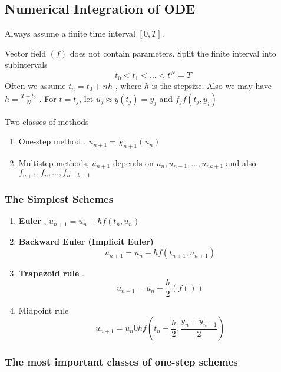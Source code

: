 \documentclass{article}
\theoremstyle{remark}
\newcommand{\newpara}
  {
  \vskip 0.4cm
  }
\begin{document}
\subsection{Numerical Integration of ODE}%
\label{sub:numerical_integration}
Always assume a finite time interval $\left[ 0,T \right]$.

Vector field $\left( f \right)$ does not contain parameters.  Split the finite interval into subintervals \[
t_{0} < t_{1} < \ldots < t^{N} = T
\] 
Often we assume $t_{n} = t_{0} + nh$ , where $h$ is the stepsize. Also we may have $h = \frac{T - t_{0}}{ N} $ . For $t = t_{j}$, let $u_{j} \approx y\left( t_{j} \right) = y_{j}$ and $f_{j} f\left( t_{j}, y_{j} \right)$


\newpara
Two classes of methods 
\begin{enumerate}
  \item One-step method , $u_{n+1} = \chi _{n+1} \left( u_{n} \right)$
  \item Multistep methods, $u_{n+1}$ depends on $u_{n}, u_{n-1}, \ldots , u_{n  k+1}$  and also $f_{n+1}, f_{n}, \ldots, f_{n-k+1}$
\end{enumerate}

\subsubsection{The Simplest Schemes}%
\label{ssub:the_simplest_schemes}

\begin{enumerate}
  \item \textbf{Euler} , $u_{n+1} = u_{n} + h f\left( t_{n} , u_{n} \right)$ 
  \item \textbf{Backward Euler (Implicit Euler)}  \[
  u_{n+1} = u_{n} + h f\left( t_{n+1}, u_{n+1} \right)
  \] 
\item \textbf{Trapezoid rule} . \[
    u_{ n+1}  = u_{n} + \frac{h}{2}  \left( f\left(  \right) \right)
\] 
\item Midpoint rule  \[
u_{n+1} = u_{n} 0 h f\left( t_{n} + \frac{h}{2},  \frac{y_{n} + y_{n+1}}{2}  \right)
\] 

\end{enumerate}

\subsubsection{The most important classes of one-step schemes}%
\label{ssub:the_most_important_classes_of_one_step_schemes}
\end{document}
